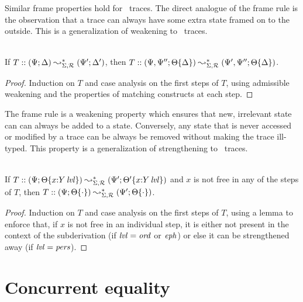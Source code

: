 Similar frame properties hold for \sls~traces. The direct analogue of
the frame rule is the observation that a trace can always have some
extra state framed on to the outside. This is a generalization of
weakening to \sls~traces.

\bigskip
\begin{theorem}\label{thm:frameweak}~\\
If $T :: (\Psi; \Delta) \leadsto^*_{\Sigma, \mathcal R} (\Psi'; \Delta')$, then
$T :: (\Psi, \Psi''; {\Theta}\{{\Delta}\})
       \leadsto^*_{\Sigma, \mathcal R} (\Psi', \Psi''; {\Theta}\{{\Delta}\})$.
\end{theorem}
\begin{proof}
Induction on $T$ and case analysis on the first steps of $T$, using admissible
weakening and the properties of matching constructs at each step.
\end{proof}

The frame rule is a weakening property which ensures that new,
irrelevant state can can always be added to a state. Conversely, any
state that is never accessed or modified by a trace can be always be 
removed without making the trace ill-typed. This property
is a generalization of strengthening to \sls~traces.

\bigskip
\begin{theorem}\label{thm:framestrong}~\\
  If $T :: (\Psi; {\Theta}\{{x{:}{Y}\,{{\it lvl}}}\}) \leadsto^*_{\Sigma,
    \mathcal R} (\Psi'; {\Theta'}\{{x{:}{Y}\,{{\it lvl}}}\})$ and $x$ is not
  free in any of the steps of $T$, then $T :: (\Psi;
  {\Theta}\{{\cdot}\}) \leadsto^*_{\Sigma, \mathcal R} (\Psi';
  {\Theta}\{{\cdot}\})$.
\end{theorem}
\begin{proof}
  Induction on $T$ and case analysis on the first steps of $T$, using
  a lemma to enforce that, if $x$ is not free in an individual step,
  it is either not present in the context of the subderivation 
  (if ${\it lvl} = {\it ord}$ or ${\it eph}$) or else
  it can be strengthened away (if ${\it lvl} = {\it pers}$).
\end{proof}

\section{Concurrent equality}
\label{sec:linconcurrenteq}
\label{sec:framework-concurrenteq}

